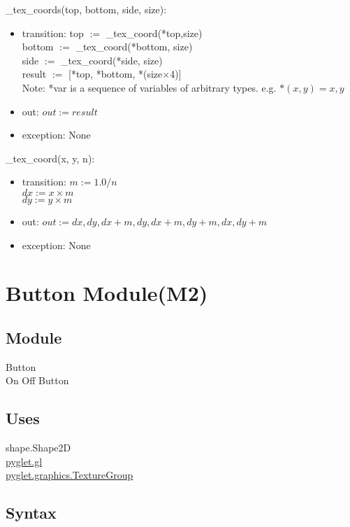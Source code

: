 \documentclass{article}
\begin{document}
\noindent \_tex\_coords(top, bottom, side, size):
\begin{itemize}
\item transition: top $:=$ \_tex\_coord(*top,size)\\
    bottom $:=$ \_tex\_coord(*bottom, size)\\
    side $:=$ \_tex\_coord(*side, size)\\
    result $:=$ [*top, *bottom, *(size$\times$4)]\\
    Note: *var is a sequence of variables of arbitrary types. e.g. $*(x, y)=x, y$ 
\item out: $out:=result$
\item exception: None
\end{itemize}\vspace{6mm}

\noindent \_tex\_coord(x, y, n):
\begin{itemize}
\item transition: $m := 1.0 / n$\\
        $dx := x \times m$\\
        $dy := y \times m$
\item out: $out:=dx, dy, dx + m, dy, dx + m, dy + m, dx, dy + m$
\item exception: None
\end{itemize}\vspace{6mm}

\newpage


\section {Button Module(M2)}

\subsection{Module}
Button\\
On Off Button

\subsection {Uses}
shape.Shape2D\\
\href{https://pyglet.readthedocs.io/en/latest/modules/gl.html}{pyglet.gl}\\
\href{https://pyglet.readthedocs.io/en/latest/modules/graphics/#pyglet.graphics.TextureGroup}{pyglet.graphics.TextureGroup}

\subsection {Syntax}
\end{document}
